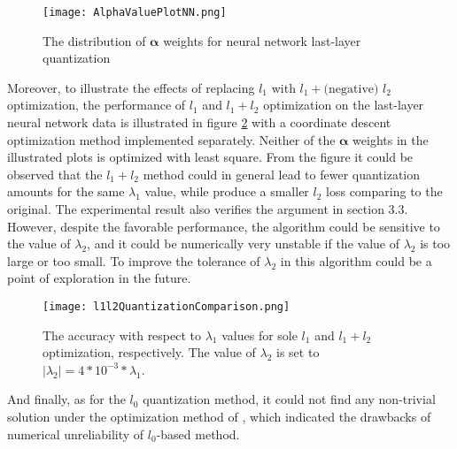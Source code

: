 \documentclass[preprint,10pt]{elsarticle}
\begin{document}
\begin{figure}
\centering
\texttt{[image: AlphaValuePlotNN.png]}
\caption{The distribution of $\boldsymbol{\alpha}$ weights for neural network last-layer quantization}
\label{fig:NNQuantizationAlphaComparison}
\end{figure}
Moreover, to illustrate the effects of replacing $l_1$ with $l_1 + \text{(negative) }l_2$ optimization, the performance of $l_1$ and $l_1 + l_2$ optimization on the last-layer neural network data is illustrated in figure \ref{fig:NNQuantizationl1l2Comparison} with a coordinate descent optimization method implemented separately. Neither of the $\boldsymbol{\alpha}$ weights in the illustrated plots is optimized with least square. From the figure it could be observed that the $l_1+l_2$ method could in general lead to fewer quantization amounts for the same $\lambda_1$ value, while produce a smaller $l_2$ loss comparing to the original. The experimental result also verifies the argument in section 3.3. However, despite the favorable performance, the algorithm could be sensitive to the value of $\lambda_2$, and it could be numerically very unstable if the value of $\lambda_2$ is too large or too small. To improve the tolerance of $\lambda_2$ in this algorithm could be a point of exploration in the future. \par
\begin{figure}
\centering
\texttt{[image: l1l2QuantizationComparison.png]}
\caption{The accuracy with respect to $\lambda_1$ values for sole $l_1$ and $l_1+l_2$ optimization, respectively. The value of $\lambda_2$ is set to $|\lambda_2| = 4*10^{-3}*\lambda_1$.}
\label{fig:NNQuantizationl1l2Comparison}
\end{figure}
And finally, as for the $l_0$ quantization method, it could not find any non-trivial solution under the optimization method of \cite{l0Learn2018Hazimeh}, which indicated the drawbacks of numerical unreliability of $l_0$-based method.
\end{document}
